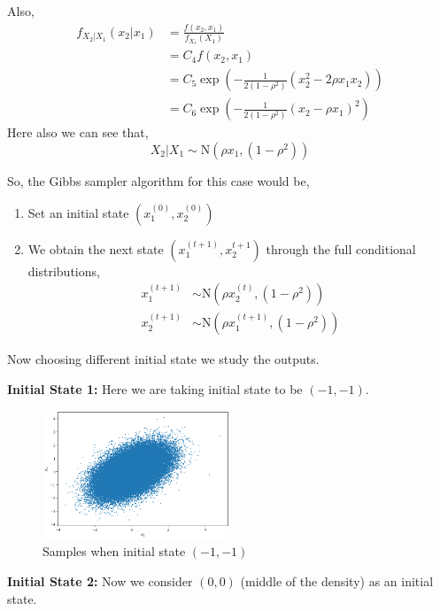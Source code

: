 \begin{example}
    Also, 
    \begin{align*}
        f_{X_2|X_1} (x_2|x_1) &= \frac{f(x_2,x_1)}{f_{X_1}(X_1)} \\ 
                    &=C_4 f(x_2,x_1) \\
                    &=C_5 \exp \left( - \frac{1}{2 (1-\rho^2)} (x_2^2 - 2 \rho x_1x_2) \right) \\
                    &= C_6 \exp \left(- \frac{1}{2 (1-\rho^2)} (x_2 - \rho x_1)^2   \right)
    \end{align*}
    Here also we can see that,
    \[
        X_2|X_1 \sim \text{N}\left(\rho x_1, (1-\rho^2)\right)
    \]

    So, the Gibbs sampler algorithm for this case would be,
    \begin{enumerate}
        \item Set an initial state $ \left(x_1^{(0)} , x_2^{(0)} \right) $
        \item We obtain the next state $ \left( x_1^{(t+1)} , x_2^{t+1} \right) $ through the full conditional distributions, 
            \begin{align*}
                x_1^{(t+1)} &\sim \text{N}\left(\rho x_2^{(t)}, (1-\rho^2) \right) \\
                x_2 ^{(t+1)} &\sim \text{N}\left(\rho x_1^{(t+1)}, (1-\rho^2) \right) 
            \end{align*}
    \end{enumerate}
    Now choosing different initial state we study the outputs.

    \textbf{Initial State 1:} Here we are taking initial state to be $(-1,-1)$. 
    \begin{figure}[H]
        \centering
        \includegraphics[width=0.5\textwidth]{images/gibbs/example1/init1.png}
        \caption{Samples when initial state $(-1,-1)$}
    \end{figure}

    \textbf{Initial State 2:} Now we consider $(0,0)$ (middle of the density) as an initial state. 


\end{example}
